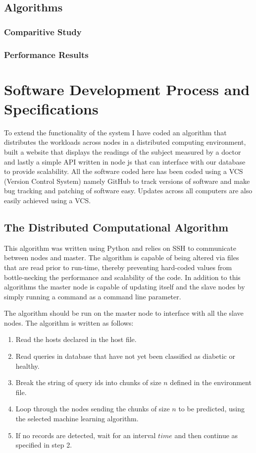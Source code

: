 \documentclass[12pt]{article}
\begin{document}
\newpage
\subsection{Algorithms}

\subsubsection{Comparitive Study}
\subsubsection{Performance Results}



\clearpage
\newpage
\section{Software Development Process and Specifications}
To extend the functionality of the system I have coded an algorithm that distributes the workloads across nodes in a distributed computing environment, built a website that displays the readings of the subject measured by a doctor and lastly a simple API written in node js that can interface with our database to provide scalability. All the software coded here has been coded using a VCS (Version Control System) namely GitHub to track versions of software and make bug tracking and patching of software easy. Updates across all computers are also easily achieved using a VCS.

\subsection{The Distributed Computational Algorithm}
This algorithm was written using Python and relies on SSH to communicate between nodes and master. The algorithm is capable of being altered via files that are read prior to run-time, thereby preventing hard-coded values from bottle-necking the performance and scalability of the code. In addition to this algorithms the master node is capable of updating itself and the slave nodes by simply running a command as a command line parameter.

The algorithm should be run on the master node to interface with all the slave nodes. The algorithm is written as follows:
\begin{enumerate}
\item Read the hosts declared in the host file.
\item Read queries in database that have not yet been classified as diabetic or healthy.
\item Break the string of query ids into chunks of size $n$ defined in the environment file.
\item Loop through the nodes sending the chunks of size $n$ to be predicted, using the selected machine learning algorithm.
\item If no records are detected, wait for an interval $time$ and then continue as specified in step 2.
\end{enumerate}
\end{document}
